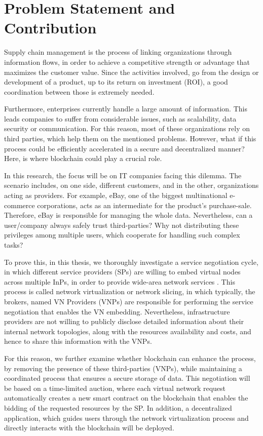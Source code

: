 \section{Problem Statement and Contribution}

Supply chain management is the process of linking organizations through information flows, in order to achieve a competitive strength or advantage that maximizes the customer value. Since the activities involved, go from the design or development of a product, up to its return on investment (ROI), a good coordination between those is extremely needed.

Furthermore, enterprises currently handle a large amount of information. This leads companies to suffer from considerable issues, such as scalability, data security or communication. For this reason, most of these organizations rely on third parties, which help them on the mentioned problems. However, what if this process could be efficiently accelerated in a secure and decentralized manner? Here, is where blockchain could play a crucial role.

In this research, the focus will be on IT companies facing this dilemma. The scenario includes, on one side, different customers, and in the other, organizations acting as providers. For example, eBay, one of the biggest multinational e-commerce corporations, acts as an intermediate for the product's purchase-sale. Therefore, eBay is responsible for managing the whole data. Nevertheless, can a user/company always safely trust third-parties? Why not distributing these privileges among multiple users, which cooperate for handling such complex tasks?

To prove this, in this thesis, we thoroughly investigate a service negotiation cycle, in which different service providers (SPs) are willing to embed virtual nodes across multiple InPs, in order to provide wide-area network services \cite{dietrich2015multi}. This process is called network virtualization or network slicing, in which typically, the brokers, named VN Providers (VNPs) are responsible for performing the service negotiation that enables the VN embedding. Nevertheless, infrastructure providers are not willing to publicly disclose detailed information about their internal network topologies, along with the resources availability and costs, and hence to share this information with the VNPs.

For this reason, we further examine whether blockchain can enhance the process, by removing the presence of these third-parties (VNPs), while maintaining a coordinated process that ensures a secure storage of data. This negotiation will be based on a time-limited auction, where each virtual network request automatically creates a new smart contract on the blockchain that enables the bidding of the requested resources by the SP. In addition, a decentralized application, which guides users through the network virtualization process and directly interacts with the blockchain will be deployed.


